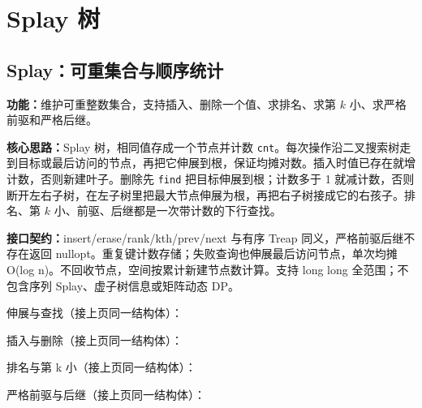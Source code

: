 \newpage

\section{Splay 树}

\subsection{Splay：可重集合与顺序统计}\label{compact-OrderedSplay}

\noindent\textbf{功能：}\allowbreak 维护可重整数集合，支持插入、删除一个值、求排名、求第 $k$ 小、求严格前驱和严格后继。

\textbf{核心思路：}\allowbreak Splay 树，相同值存成一个节点并计数 \texttt{cnt}。每次操作沿二叉搜索树走到目标或最后访问的节点，再把它伸展到根，保证均摊对数。插入时值已存在就增计数，否则新建叶子。删除先 \texttt{find} 把目标伸展到根；计数多于 1 就减计数，否则断开左右子树，在左子树里把最大节点伸展为根，再把右子树接成它的右孩子。排名、第 $k$ 小、前驱、后继都是一次带计数的下行查找。



{\sloppy{}\noindent\textbf{接口契约：}insert/erase/rank/kth/prev/next 与有序 Treap 同义，严格前驱后继不存在返回 nullopt。重复键计数存储；失败查询也伸展最后访问节点，单次均摊 O(log n)。不回收节点，空间按累计新建节点数计算。支持 long long 全范围；不包含序列 Splay、虚子树信息或矩阵动态 DP。\par}

\Needspace{585pt}



\newpage

\noindent 伸展与查找（接上页同一结构体）：



\newpage

\noindent 插入与删除（接上页同一结构体）：



\newpage

\noindent 排名与第 k 小（接上页同一结构体）：



\newpage

\noindent 严格前驱与后继（接上页同一结构体）：

